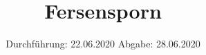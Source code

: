 

\subject{TPS Praktikum}
\title{Fersensporn}
\date{%
  Durchführung: 22.06.2020
  \hspace{3em}
  Abgabe: 28.06.2020
}



\maketitle
\thispagestyle{empty}
\tableofcontents
\newpage





\printbibliography{}
\nocite{*}


